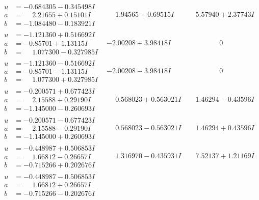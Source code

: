 \documentclass[1p]{elsarticle_modified}
\theoremstyle{definition}
\begin{document}
$$\begin{array}{c|c|c}
\begin{aligned}
u &= -0.684305 - 0.345498 I \\
a &= \phantom{-}2.21655 + 0.15101 I \\
b &= -1.084480 - 0.183921 I\end{aligned}
 & \phantom{-}1.94565 + 0.69515 I & \phantom{-}5.57940 + 2.37743 I \\ \hline\begin{aligned}
u &= -1.121360 + 0.516692 I \\
a &= -0.85701 + 1.13115 I \\
b &= \phantom{-}1.077300 - 0.327985 I\end{aligned}
 & -2.00208 + 3.98418 I & \phantom{-0.000000 } 0 \\ \hline\begin{aligned}
u &= -1.121360 - 0.516692 I \\
a &= -0.85701 - 1.13115 I \\
b &= \phantom{-}1.077300 + 0.327985 I\end{aligned}
 & -2.00208 - 3.98418 I & \phantom{-0.000000 } 0 \\ \hline\begin{aligned}
u &= -0.200571 + 0.677423 I \\
a &= \phantom{-}2.15588 + 0.29190 I \\
b &= -1.145000 - 0.260693 I\end{aligned}
 & \phantom{-}0.568023 + 0.563021 I & \phantom{-}1.46294 - 0.43596 I \\ \hline\begin{aligned}
u &= -0.200571 - 0.677423 I \\
a &= \phantom{-}2.15588 - 0.29190 I \\
b &= -1.145000 + 0.260693 I\end{aligned}
 & \phantom{-}0.568023 - 0.563021 I & \phantom{-}1.46294 + 0.43596 I \\ \hline\begin{aligned}
u &= -0.448987 + 0.506853 I \\
a &= \phantom{-}1.66812 - 0.26657 I \\
b &= -0.715266 + 0.202676 I\end{aligned}
 & \phantom{-}1.316970 - 0.435931 I & \phantom{-}7.52137 + 1.21169 I \\ \hline\begin{aligned}
u &= -0.448987 - 0.506853 I \\
a &= \phantom{-}1.66812 + 0.26657 I \\
b &= -0.715266 - 0.202676 I\end{aligned}

\end{array}$$
\end{document}
